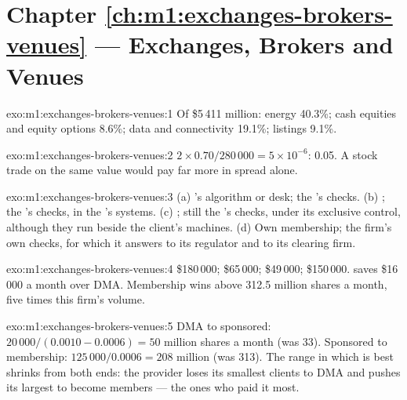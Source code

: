 \section*{Chapter \ref{ch:m1:exchanges-brokers-venues} --- Exchanges, Brokers and Venues}

\begin{solution}{exo:m1:exchanges-brokers-venues:1}
Of \$5\,411 million: energy 40.3\%; cash equities and equity options 8.6\%;
data and connectivity 19.1\%; listings 9.1\%.
\end{solution}

\begin{solution}{exo:m1:exchanges-brokers-venues:2}
$2 \times 0.70/280\,000 = 5\times10^{-6}$: \qty{0.05}{\bp}. A stock trade on
the same value would pay far more in spread alone.
\end{solution}

\begin{solution}{exo:m1:exchanges-brokers-venues:3}
(a) 's algorithm or desk; the 's checks. (b) ; the 's checks, in the 's systems. (c) ;
still the 's checks, under its exclusive control, although they run
beside the client's machines. (d) Own membership; the firm's own checks, for
which it answers to its regulator and to its clearing firm.
\end{solution}

\begin{solution}{exo:m1:exchanges-brokers-venues:4}
\$180\,000; \$65\,000; \$49\,000; \$150\,000.  saves
\$16\,000 a month over DMA. Membership wins above 312.5 million shares a
month, five times this firm's volume.
\end{solution}

\begin{solution}{exo:m1:exchanges-brokers-venues:5}
DMA to sponsored: $20\,000/(0.0010-0.0006) = 50$ million shares a month
(was 33). Sponsored to membership: $125\,000/0.0006 = 208$ million (was
313). The range in which  is best shrinks from both ends: the
provider loses its smallest clients to DMA and pushes its largest to become
members --- the ones who paid it most.
\end{solution}

